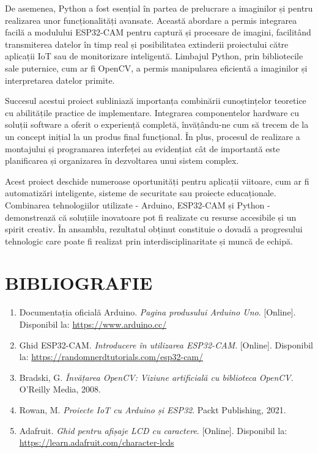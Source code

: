 \documentclass[a4paper,12pt]{report}
\begin{document}
De asemenea, Python a fost esențial în partea de prelucrare a imaginilor și pentru realizarea unor funcționalități avansate. Această abordare a permis integrarea facilă a modulului ESP32-CAM pentru captură și procesare de imagini, facilitând transmiterea datelor în timp real și posibilitatea extinderii proiectului către aplicații IoT sau de monitorizare inteligentă. Limbajul Python, prin bibliotecile sale puternice, cum ar fi OpenCV, a permis manipularea eficientă a imaginilor și interpretarea datelor primite.

Succesul acestui proiect subliniază importanța combinării cunoștințelor teoretice cu abilitățile practice de implementare. Integrarea componentelor hardware cu soluții software a oferit o experiență completă, învățându-ne cum să trecem de la un concept inițial la un produs final funcțional. În plus, procesul de realizare a montajului și programarea interfeței au evidențiat cât de importantă este planificarea și organizarea în dezvoltarea unui sistem complex.

Acest proiect deschide numeroase oportunități pentru aplicații viitoare, cum ar fi automatizări inteligente, sisteme de securitate sau proiecte educaționale. Combinarea tehnologiilor utilizate - Arduino, ESP32-CAM și Python - demonstrează că soluțiile inovatoare pot fi realizate cu resurse accesibile și un spirit creativ. În ansamblu, rezultatul obținut constituie o dovadă a progresului tehnologic care poate fi realizat prin interdisciplinaritate și muncă de echipă.

\chapter*{BIBLIOGRAFIE}

\begin{enumerate}
    \item Documentația oficială Arduino. \emph{Pagina produsului Arduino Uno}. [Online]. Disponibil la: 
    \url{https://www.arduino.cc/}

    \item Ghid ESP32-CAM. \emph{Introducere în utilizarea ESP32-CAM}. [Online]. Disponibil la: 
    \url{https://randomnerdtutorials.com/esp32-cam/}

    \item Bradski, G. \emph{Învățarea OpenCV: Viziune artificială cu biblioteca OpenCV}. O'Reilly Media, 2008.

    \item Rowan, M. \emph{Proiecte IoT cu Arduino și ESP32}. Packt Publishing, 2021.

    \item Adafruit. \emph{Ghid pentru afișaje LCD cu caractere}. [Online]. Disponibil la: 
    \url{https://learn.adafruit.com/character-lcds}
\end{enumerate}
\end{document}
